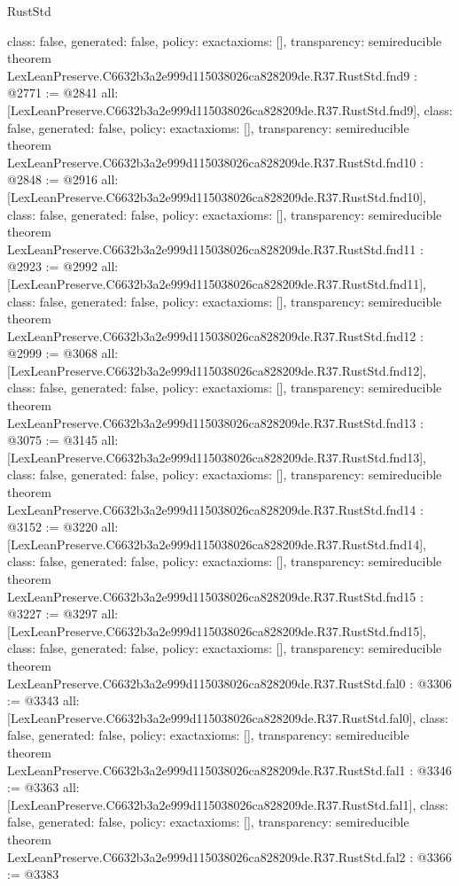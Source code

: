 \begin{lexlean}{RustStd}
\begin{coremodule}
{  class: false,
  generated: false,
  policy: exact{axioms: []},
  transparency: semireducible
}
theorem LexLeanPreserve.C6632b3a2e999d115038026ca828209de.R37.RustStd.fnd9 : @2771 := @2841 {
  all: [LexLeanPreserve.C6632b3a2e999d115038026ca828209de.R37.RustStd.fnd9],
  class: false,
  generated: false,
  policy: exact{axioms: []},
  transparency: semireducible
}
theorem LexLeanPreserve.C6632b3a2e999d115038026ca828209de.R37.RustStd.fnd10 : @2848 := @2916 {
  all: [LexLeanPreserve.C6632b3a2e999d115038026ca828209de.R37.RustStd.fnd10],
  class: false,
  generated: false,
  policy: exact{axioms: []},
  transparency: semireducible
}
theorem LexLeanPreserve.C6632b3a2e999d115038026ca828209de.R37.RustStd.fnd11 : @2923 := @2992 {
  all: [LexLeanPreserve.C6632b3a2e999d115038026ca828209de.R37.RustStd.fnd11],
  class: false,
  generated: false,
  policy: exact{axioms: []},
  transparency: semireducible
}
theorem LexLeanPreserve.C6632b3a2e999d115038026ca828209de.R37.RustStd.fnd12 : @2999 := @3068 {
  all: [LexLeanPreserve.C6632b3a2e999d115038026ca828209de.R37.RustStd.fnd12],
  class: false,
  generated: false,
  policy: exact{axioms: []},
  transparency: semireducible
}
theorem LexLeanPreserve.C6632b3a2e999d115038026ca828209de.R37.RustStd.fnd13 : @3075 := @3145 {
  all: [LexLeanPreserve.C6632b3a2e999d115038026ca828209de.R37.RustStd.fnd13],
  class: false,
  generated: false,
  policy: exact{axioms: []},
  transparency: semireducible
}
theorem LexLeanPreserve.C6632b3a2e999d115038026ca828209de.R37.RustStd.fnd14 : @3152 := @3220 {
  all: [LexLeanPreserve.C6632b3a2e999d115038026ca828209de.R37.RustStd.fnd14],
  class: false,
  generated: false,
  policy: exact{axioms: []},
  transparency: semireducible
}
theorem LexLeanPreserve.C6632b3a2e999d115038026ca828209de.R37.RustStd.fnd15 : @3227 := @3297 {
  all: [LexLeanPreserve.C6632b3a2e999d115038026ca828209de.R37.RustStd.fnd15],
  class: false,
  generated: false,
  policy: exact{axioms: []},
  transparency: semireducible
}
theorem LexLeanPreserve.C6632b3a2e999d115038026ca828209de.R37.RustStd.fal0 : @3306 := @3343 {
  all: [LexLeanPreserve.C6632b3a2e999d115038026ca828209de.R37.RustStd.fal0],
  class: false,
  generated: false,
  policy: exact{axioms: []},
  transparency: semireducible
}
theorem LexLeanPreserve.C6632b3a2e999d115038026ca828209de.R37.RustStd.fal1 : @3346 := @3363 {
  all: [LexLeanPreserve.C6632b3a2e999d115038026ca828209de.R37.RustStd.fal1],
  class: false,
  generated: false,
  policy: exact{axioms: []},
  transparency: semireducible
}
theorem LexLeanPreserve.C6632b3a2e999d115038026ca828209de.R37.RustStd.fal2 : @3366 := @3383 {
}
\end{coremodule}
\end{lexlean}
